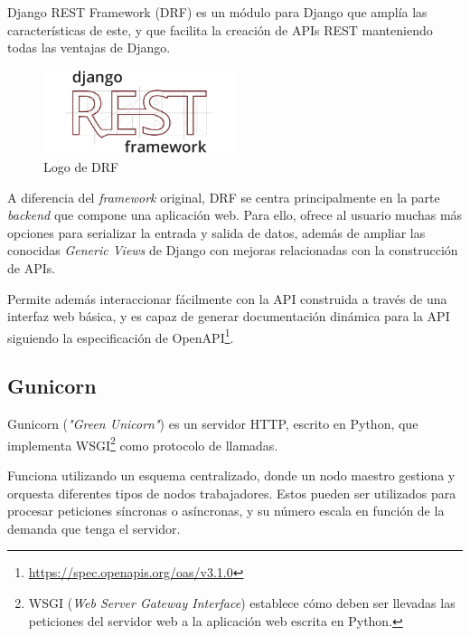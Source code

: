 Django REST Framework (DRF) es un módulo para Django que amplía las características de este, y que facilita la creación de APIs REST manteniendo todas las ventajas de Django. \emph{\parencite{Reference7}}

\begin{figure}[ht]
    \centering
    \includegraphics[width=0.5\textwidth]{Figures/drf-logo}
    \decoRule
    \caption[DRF (Logo)]{Logo de DRF \emph{\parencite{Reference8}}}
    \label{fig:drf-logo}
\end{figure}

A diferencia del \emph{framework} original, DRF se centra principalmente en la parte \emph{backend} que compone una aplicación web. Para ello, ofrece al usuario muchas más opciones para serializar la entrada y salida de datos, además de ampliar las conocidas \emph{Generic Views} de Django con mejoras relacionadas con la construcción de APIs. \emph{\parencite{Reference7}}

Permite además interaccionar fácilmente con la API construida a través de una interfaz web básica, y es capaz de generar documentación dinámica para la API siguiendo la especificación de OpenAPI\footnote{\url{https://spec.openapis.org/oas/v3.1.0}}. \emph{\parencite{Reference7}}

\subsection{Gunicorn}

Gunicorn (\emph{"Green Unicorn"}) es un servidor HTTP, escrito en Python, que implementa WSGI\footnote{WSGI (\emph{Web Server Gateway Interface}) establece cómo deben ser llevadas las peticiones del servidor web a la aplicación web escrita en Python\emph{\parencite{Reference11}}.} como protocolo de llamadas.

Funciona utilizando un esquema centralizado, donde un nodo maestro gestiona y orquesta diferentes tipos de nodos trabajadores. Estos pueden ser utilizados para procesar peticiones síncronas o asíncronas, y su número escala en función de la demanda que tenga el servidor. \emph{\parencite{Reference9}}

